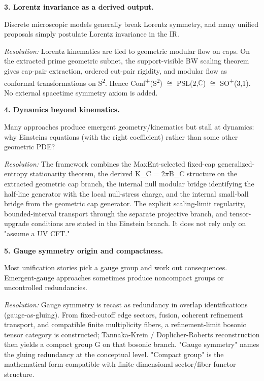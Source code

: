 \textbf{3. Lorentz invariance as a derived output.}

Discrete microscopic models generally break Lorentz symmetry, and many unified proposals simply postulate Lorentz invariance in the IR.

\emph{Resolution:} Lorentz kinematics are tied to geometric modular flow on caps. On the extracted prime geometric subnet, the support-visible BW scaling theorem gives cap-pair extraction, ordered cut-pair rigidity, and modular flow as conformal transformations on S\textsuperscript{2}. Hence Conf\textsuperscript{+}(S\textsuperscript{2}) \ensuremath{\cong} PSL(2,\ensuremath{\mathbb{C}}) \ensuremath{\cong} SO\textsuperscript{+}(3,1). No external spacetime symmetry axiom is added.

\textbf{4. Dynamics beyond kinematics.}

Many approaches produce emergent geometry/kinematics but stall at dynamics: why Einstein\textquotesingle s equations (with the right coefficient) rather than some other geometric PDE?

\emph{Resolution:} The framework combines the MaxEnt-selected fixed-cap generalized-entropy stationarity theorem, the derived K\_C = 2\ensuremath{\pi}B\_C structure on the extracted geometric cap branch, the internal null modular bridge identifying the half-line generator with the local null-stress charge, and the internal small-ball bridge from the geometric cap generator. The explicit scaling-limit regularity, bounded-interval transport through the separate projective branch, and tensor-upgrade conditions are stated in the Einstein branch. It does not rely only on "assume a UV CFT."

\textbf{5. Gauge symmetry origin and compactness.}

Most unification stories pick a gauge group and work out consequences. Emergent-gauge approaches sometimes produce noncompact groups or uncontrolled redundancies.

\emph{Resolution:} Gauge symmetry is recast as redundancy in overlap identifications (gauge-as-gluing). From fixed-cutoff edge sectors, fusion, coherent refinement transport, and compatible finite multiplicity fibers, a refinement-limit bosonic tensor category is constructed; Tannaka-Krein / Doplicher-Roberts reconstruction then yields a compact group G on that bosonic branch. "Gauge symmetry" names the gluing redundancy at the conceptual level. "Compact group" is the mathematical form compatible with finite-dimensional sector/fiber-functor structure.

